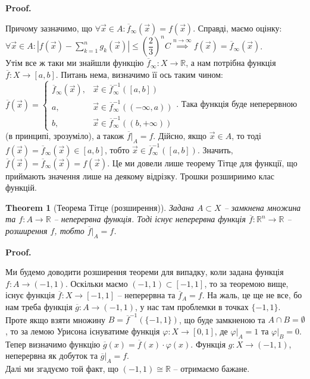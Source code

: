 \documentclass[a4paper, 10pt]{article}
\makeatletter
\def\qed{$\blacksquare$}
\theoremstyle{theoremdd}
\newtheorem{theorem}{Theorem}[subsection]
\theoremstyle{theoremdd}
\theoremstyle{theoremdd}
\theoremstyle{theoremdd}
\theoremstyle{theoremdd}
\theoremstyle{theoremdd}
\theoremstyle{theoremdd}
\theoremstyle{theoremdd}
\renewenvironment{proof}[1][Proof.\\]{\par
\pushQED{\hfill \qed}%
\normalfont \topsep6\p@\@plus6\p@\relax
\trivlist
\item\relax
{\bfseries
#1\@addpunct{.}}\hspace\labelsep\ignorespaces
}{%
\popQED\endtrivlist\@endpefalse
}
\makeatother
\begin{document}
\begin{proof}
Причому зазначимо, що $\forall \vec{x} \in A: \overline{f}_\infty(\vec{x}) = f(\vec{x})$. Справді, маємо оцінку:\\
$\forall \vec{x} \in A: \displaystyle\left| f(\vec{x}) - \sum_{k=1}^n g_k(\vec{x}) \right| \leq \left(\dfrac{2}{3}\right)^n C \overset{n \to \infty}{\implies} f(\vec{x}) = \overline{f}_\infty(\vec{x})$.\\
Утім все ж таки ми знайшли функцію $\overline{f}_\infty \colon X \to \mathbb{R}$, а нам потрібна функція $\overline{f} \colon X \to [a,b]$. Питань нема, визначимо її ось таким чином: $\overline{f}(\vec{x}) = \begin{cases} \overline{f}_\infty(\vec{x}), & \vec{x} \in \overline{f}_\infty^{-1}([a,b]) \\ a, & \vec{x} \in \overline{f}_\infty^{-1}((-\infty,a)) \\ b, & \vec{x} \in \overline{f}_\infty^{-1}((b,+\infty)) \end{cases}$. Така функція буде неперервною (в принципі, зрозуміло), а також $\overline{f}|_A = f$. Дійсно, якщо $\vec{x} \in A$, то тоді $f(\vec{x}) = \overline{f}_\infty(\vec{x}) \in [a,b]$, тобто $\vec{x} \in \overline{f}_\infty^{-1}([a,b])$. Значить, $\overline{f}(\vec{x}) = \overline{f}_\infty(\vec{x}) = f(\vec{x})$.
\end{proof}
\noindent
Це ми довели лише теорему Тітце для функції, що приймають значення лише на деякому відрізку. Трошки розшириимо клас функцій.

\begin{theorem}[Теорема Тітце (розширення)]
Задана $A \subset X$ -- замкнена множина та $f \colon A \to \mathbb{R}$ -- неперервна функція. Тоді існує неперервна функція $\overline{f} \colon \mathbb{R}^n \to \mathbb{R}$ -- розширення $f$, тобто $\overline{f}|_{A} = f$.
\end{theorem}

\begin{proof}
Ми будемо доводити розширення теореми для випадку, коли задана функція $f \colon A \to (-1,1)$. Оскільки маємо $(-1,1) \subset [-1,1]$, то за теоремою вище, існує функція $\overline{f} \colon X \to [-1,1]$ -- неперервна та $\overline{f}_A = f$. На жаль, це ще не все, бо нам треба функція $\overline{g} \colon A \to (-1,1)$, у нас там проблемки в точках $\{-1,1\}$.\\
Проте якщо взяти множину $B = \overline{f}^{-1}(\{-1,1\})$, що буде замкненою та $A \cap B = \emptyset$, то за лемою Урисона існуватиме функція $\varphi \colon X \to [0,1]$, де $\varphi|_A = 1$ та $\varphi|_B = 0$. Тепер визначимо функцію $\overline{g}(x) = \overline{f}(x) \cdot \varphi(x)$. Функція $g \colon X \to (-1,1)$, неперервна як добуток та $\overline{g}|_A = f$.\\
Далі ми згадуємо той факт, що $(-1,1) \cong \mathbb{R}$ -- отримаємо бажане.
\end{proof}
\newpage
\fi
\end{document}
